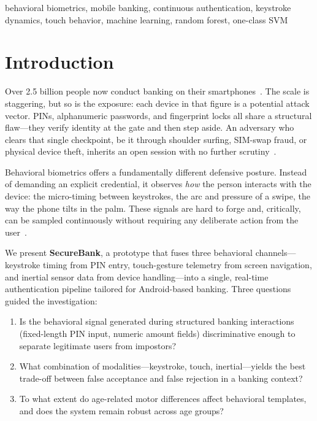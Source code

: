 \documentclass[conference]{IEEEtran}
\begin{document}
\begin{IEEEkeywords}
behavioral biometrics, mobile banking, continuous authentication, keystroke dynamics, touch behavior, machine learning, random forest, one-class SVM
\end{IEEEkeywords}

\section{Introduction}

Over 2.5 billion people now conduct banking on their smartphones~\cite{statista2024}. The scale is staggering, but so is the exposure: each device in that figure is a potential attack vector. PINs, alphanumeric passwords, and fingerprint locks all share a structural flaw---they verify identity at the gate and then step aside. An adversary who clears that single checkpoint, be it through shoulder surfing, SIM-swap fraud, or physical device theft, inherits an open session with no further scrutiny~\cite{khan2014survey}.

Behavioral biometrics offers a fundamentally different defensive posture. Instead of demanding an explicit credential, it observes \textit{how} the person interacts with the device: the micro-timing between keystrokes, the arc and pressure of a swipe, the way the phone tilts in the palm. These signals are hard to forge and, critically, can be sampled continuously without requiring any deliberate action from the user~\cite{teh2013survey}.

We present \textbf{SecureBank}, a prototype that fuses three behavioral channels---keystroke timing from PIN entry, touch-gesture telemetry from screen navigation, and inertial sensor data from device handling---into a single, real-time authentication pipeline tailored for Android-based banking. Three questions guided the investigation:

\begin{enumerate}
    \item Is the behavioral signal generated during structured banking interactions (fixed-length PIN input, numeric amount fields) discriminative enough to separate legitimate users from impostors?
    \item What combination of modalities---keystroke, touch, inertial---yields the best trade-off between false acceptance and false rejection in a banking context?
    \item To what extent do age-related motor differences affect behavioral templates, and does the system remain robust across age groups?
\end{enumerate}
\end{document}
